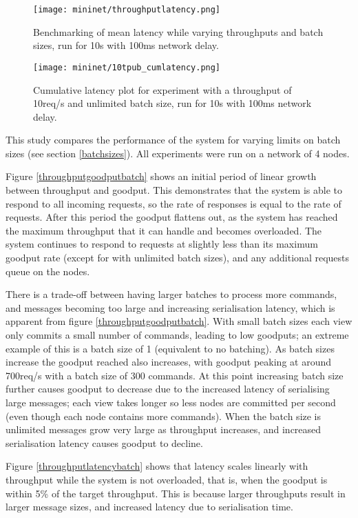 \begin{figure}[h!]
\centering
\texttt{[image: mininet/throughputlatency.png]}
\caption{Benchmarking of mean latency while varying throughputs and batch sizes, run for 10s with 100ms network delay.}
\end{figure}

\begin{figure}[h!]
\centering
\texttt{[image: mininet/10tpub\_cumlatency.png]}
\caption{Cumulative latency plot for experiment with a throughput of 10req/s and unlimited batch size, run for 10s with 100ms network delay.}
\end{figure}

This study compares the performance of the system for varying limits on batch sizes (see section \ref{batchsizes}). All experiments were run on a network of 4 nodes.

Figure \ref{throughputgoodputbatch} shows an initial period of linear growth between throughput and goodput. This demonstrates that the system is able to respond to all incoming requests, so the rate of responses is equal to the rate of requests. After this period the goodput flattens out, as the system has reached the maximum throughput that it can handle and becomes overloaded. The system continues to respond to requests at slightly less than its maximum goodput rate (except for with unlimited batch sizes), and any additional requests queue on the nodes.

There is a trade-off between having larger batches to process more commands, and messages becoming too large and increasing serialisation latency, which is apparent from figure \ref{throughputgoodputbatch}. With small batch sizes each view only commits a small number of commands, leading to low goodputs; an extreme example of this is a batch size of 1 (equivalent to no batching). As batch sizes increase the goodput reached also increases, with goodput peaking at around 700req/s with a batch size of 300 commands. At this point increasing batch size further causes goodput to decrease due to the increased latency of serialising large messages; each view takes longer so less nodes are committed per second (even though each node contains more commands). When the batch size is unlimited messages grow very large as throughput increases, and increased serialisation latency causes goodput to decline.

Figure \ref{throughputlatencybatch} shows that latency scales linearly with throughput while the system is not overloaded, that is, when the goodput is within 5\% of the target throughput. This is because larger throughputs result in larger message sizes, and increased latency due to serialisation time. 

